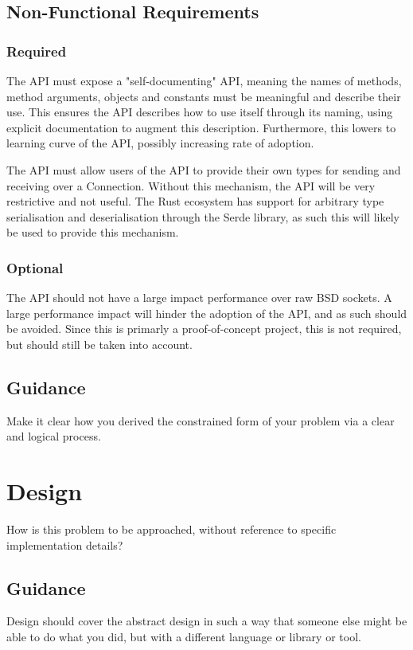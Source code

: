 \documentclass{l4proj}
\begin{document}
\section{Non-Functional Requirements}

\subsection{Required}

The API must expose a "self-documenting" API, meaning the names of methods, method arguments, objects and constants must be
meaningful and describe their use.
This ensures the API describes how to use itself through its naming, using explicit documentation to augment this description.
Furthermore, this lowers to learning curve of the API, possibly increasing rate of adoption.

The API must allow users of the API to provide their own types for sending and receiving over a Connection.
Without this mechanism, the API will be very restrictive and not useful.
The Rust ecosystem has support for arbitrary type serialisation and deserialisation through the Serde library, as such this
will likely be used to provide this mechanism.

\subsection{Optional}

The API should not have a large impact performance over raw BSD sockets.
A large performance impact will hinder the adoption of the API, and as such should be avoided.
Since this is primarly a proof-of-concept project, this is not required, but should still be taken into account.

\section{Guidance}
Make it clear how you derived the constrained form of your problem via a clear and logical process. 

\chapter{Design}
How is this problem to be approached, without reference to specific implementation details? 
\section{Guidance}
Design should cover the abstract design in such a way that someone else might be able to do what you did, but with a different language or library or tool.
\end{document}
